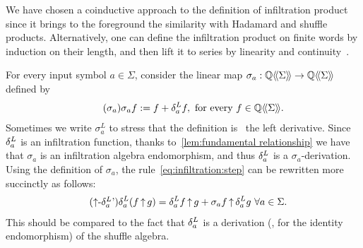 \begin{remark}
    We have chosen a coinductive approach to the definition of infiltration product
    since it brings to the foreground the similarity with Hadamard and shuffle products.
    Alternatively, one can define the infiltration product on finite words by induction on their length,
    and then lift it to series by linearity and continuity~\cite[page 126]{Lothaire:CUP:1997}.
\end{remark}

\begin{remark}
    For every input symbol $a \in \Sigma$,
    consider the linear map $\sigma_a : \mathbb Q\langle\!\langle\Sigma\rangle\!\rangle \to \mathbb Q\langle\!\langle\Sigma\rangle\!\rangle$ defined by
    \begin{align}
        \tag{$\sigma_a$}
        \sigma_a f := f + \deriveleft a f,
        \text{ for every } f \in \series \Q \Sigma. %
    \end{align}
    Sometimes we write $\sigma^L_a$ to stress that the definition is \wrt~the left derivative.
    Since $\delta^L_{a}$ is an infiltration function,
    thanks to~\cref{lem:fundamental relationship}
    we have that $\sigma_a$ is an infiltration algebra endomorphism,
    and thus $\delta^L_{a}$ is a $\sigma_a$-derivation.
    Using the definition of $\sigma_a$,
    the rule~\cref{eq:infiltration:step} can be rewritten more succinctly as follows:
    \begin{align}
        \tag{${\infiltration}$-$\deriveleft a$'}
        \label{eq:infiltration:step'}
            \deriveleft a (f \infiltration g)
            &= \deriveleft a f \infiltration g
                + \sigma_a f \infiltration \deriveleft a g
            \ \forall a \in \Sigma.
    \end{align}
    This should be compared to the fact that $\delta^L_{a}$ is a derivation
    (\ie, for the identity endomorphism) of the shuffle algebra.
\end{remark}

